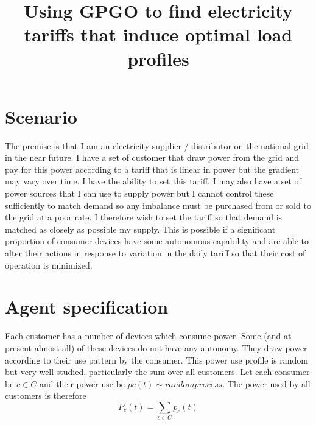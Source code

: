 \documentclass[11pt]{article}
\title{\textbf{Using GPGO to find electricity tariffs that
induce optimal load profiles
}}
\author{}
\date{}
\begin{document}
\maketitle


\section{Scenario}

The premise is that I am an electricity supplier / distributor on the national grid
in the near future. I have a set of customer that draw power from the grid and
pay for this power according to a tariff that is linear in power but the gradient
may vary over time. I have the ability to set this tariff. I may also have a
set of power sources that I can use to supply power but I cannot control these
sufficiently to match demand so any imbalance must be purchased from or sold
to the grid at a poor rate. I therefore wish to set the tariff so that demand
is matched as closely as possible my supply. This is possible if a significant
proportion of consumer devices have some autonomous capability and are able
to alter their actions in response to variation in the daily tariff so that their cost
of operation is minimized.

\section{Agent specification}
Each customer has a number of devices which consume power. Some (and at
present almost all) of these devices do not have any autonomy. They draw
power according to their use pattern by the consumer. This power use profile
is random but very well studied, particularly the sum over all customers. Let
each consumer be $c \in C$ and their power use be $pc (t) \sim randomprocess$. The
power used by all customers is therefore
\begin{equation}
P_{c} (t) = \sum_{c \in C} p_{c} (t)
\end{equation}
\end{document}
